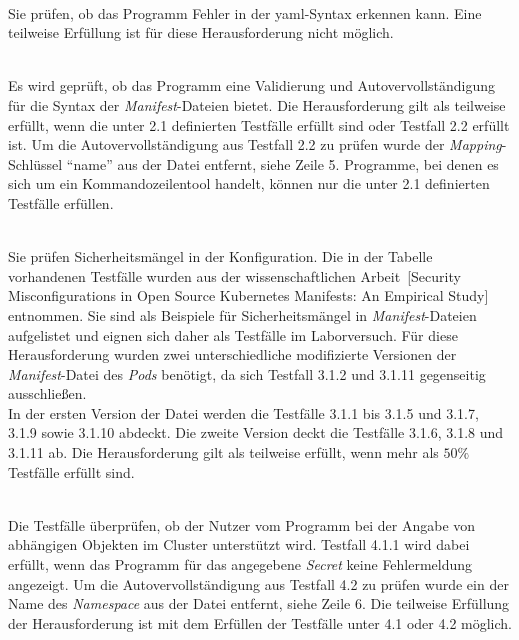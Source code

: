 \begin{description}
  \setlength\itemsep{-0.5cm}
  \item[Testfälle für Herausforderung 1]{~\\}
        Sie prüfen, ob das Programm Fehler in der \ac{yaml}-Syntax erkennen kann.
        Eine teilweise Erfüllung ist für diese Herausforderung nicht möglich.
  \item[Testfälle für Herausforderung 2]{~\\}
        Es wird geprüft, ob das Programm eine Validierung und Autovervollständigung für die Syntax der \textit{Manifest}-Dateien
        bietet. Die Herausforderung gilt als teilweise erfüllt, wenn die unter 2.1 definierten Testfälle erfüllt sind oder Testfall 2.2 erfüllt ist.
        Um die Autovervollständigung aus Testfall 2.2 zu prüfen wurde der \textit{Mapping}-Schlüssel ``name'' aus der Datei entfernt, siehe Zeile 5.
        Programme, bei denen es sich um ein Kommandozeilentool handelt, können nur die unter 2.1 definierten Testfälle erfüllen.
  \item[Testfälle für Herausforderung 3]{~\\}
        Sie prüfen Sicherheitsmängel in der Konfiguration. Die in der Tabelle vorhandenen Testfälle wurden
        aus der wissenschaftlichen Arbeit~\cite{10.1145/3579639}[Security Misconfigurations in Open Source Kubernetes Manifests: An Empirical Study]
        entnommen. Sie sind als Beispiele für Sicherheitsmängel in \textit{Manifest}-Dateien aufgelistet und eignen sich daher als Testfälle im Laborversuch.
        Für diese Herausforderung wurden zwei unterschiedliche modifizierte Versionen der \textit{Manifest}-Datei des \textit{Pods} benötigt,
        da sich Testfall 3.1.2 und 3.1.11 gegenseitig ausschließen.
        \\
        In der ersten Version der Datei werden die Testfälle 3.1.1 bis 3.1.5 und 3.1.7, 3.1.9 sowie 3.1.10 abdeckt.
        Die zweite Version deckt die Testfälle 3.1.6, 3.1.8 und 3.1.11 ab.
        Die Herausforderung gilt als teilweise erfüllt, wenn mehr als $50\%$ Testfälle erfüllt sind.

  \item[Testfälle für Herausforderung 4]{~\\}
        Die Testfälle überprüfen, ob der Nutzer vom Programm bei der Angabe von abhängigen Objekten im Cluster unterstützt wird.
        Testfall 4.1.1 wird dabei erfüllt, wenn das Programm für das angegebene \textit{Secret} keine Fehlermeldung angezeigt.
        Um die Autovervollständigung aus Testfall 4.2 zu prüfen wurde ein der Name des \textit{Namespace} aus der Datei entfernt, siehe Zeile 6.
        Die teilweise Erfüllung der Herausforderung ist mit dem Erfüllen der Testfälle unter 4.1 oder 4.2 möglich.
\end{description}

